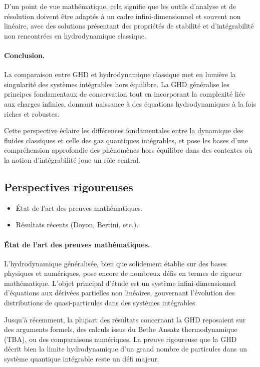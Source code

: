 D’un point de vue mathématique, cela signifie que les outils d’analyse et de résolution doivent être adaptés à un cadre infini-dimensionnel et souvent non linéaire, avec des solutions présentant des propriétés de stabilité et d’intégrabilité non rencontrées en hydrodynamique classique.

\paragraph{Conclusion.}
La comparaison entre GHD et hydrodynamique classique met en lumière la singularité des systèmes intégrables hors équilibre. La GHD généralise les principes fondamentaux de conservation tout en incorporant la complexité liée aux charges infinies, donnant naissance à des équations hydrodynamiques à la fois riches et robustes.

Cette perspective éclaire les différences fondamentales entre la dynamique des fluides classiques et celle des gaz quantiques intégrables, et pose les bases d’une compréhension approfondie des phénomènes hors équilibre dans des contextes où la notion d’intégrabilité joue un rôle central.


\subsection{Perspectives rigoureuses}
{\color{blue}
\begin{itemize}
    \item État de l’art des preuves mathématiques.
    \item Résultats récents (Doyon, Bertini, etc.).
\end{itemize}
}

\paragraph{État de l’art des preuves mathématiques.}
L’hydrodynamique généralisée, bien que solidement établie sur des bases physiques et numériques, pose encore de nombreux défis en termes de rigueur mathématique. L’objet principal d’étude est un système infini-dimensionnel d’équations aux dérivées partielles non linéaires, gouvernant l’évolution des distributions de quasi-particules dans des systèmes intégrables.

Jusqu’à récemment, la plupart des résultats concernant la GHD reposaient sur des arguments formels, des calculs issus du Bethe Ansatz thermodynamique (TBA), ou des comparaisons numériques. La preuve rigoureuse que la GHD décrit bien la limite hydrodynamique d’un grand nombre de particules dans un système quantique intégrable reste un défi majeur.

